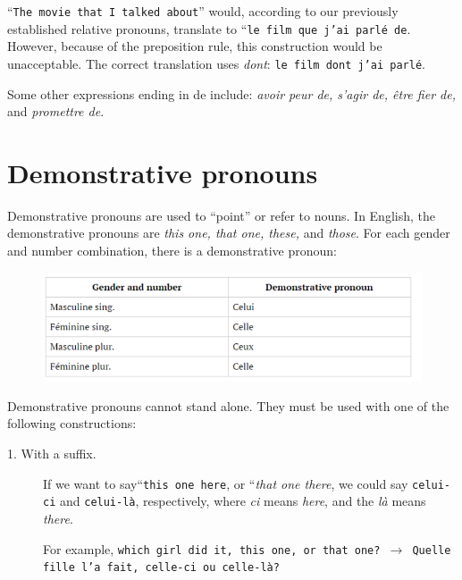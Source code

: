 \documentclass[11pt, oneside]{book}
\begin{document}
{{{	``\texttt{The movie that I talked about}” would, according to our previously established relative pronouns, translate to ``\texttt{le film que j'ai parl\'e de}. However, because of the preposition rule, this construction would be unacceptable. The correct translation uses \textit{dont}: \texttt{le film dont j'ai parl\'e}.  \vspace{0.5\baselineskip}

	Some other expressions ending in de include: \textit{avoir peur de, s'agir de, \^etre fier de,} and \textit{promettre de}. \vspace{0.5\baselineskip}


\section{Demonstrative pronouns}

Demonstrative pronouns are used to ``point” or refer to nouns. In English, the demonstrative pronouns are \textit{this one, that one, these,} and \textit{those}. For each gender and number combination, there is a demonstrative pronoun: \vspace{0.5\baselineskip}


\begin{figure}[H]
	\includegraphics[scale=0.6]{charts/demonstrativePronouns.png}
\end{figure} \vspace{0.5\baselineskip} 

Demonstrative pronouns cannot stand alone. They must be used with one of the following constructions:

\begin{description}
	\item[1.  With a suffix.] If we want to say``\texttt{this one here}, or ``\textit{that one there}, we could say \texttt{celui-ci} and \texttt{celui-l\`a}, respectively, where \textit{ci} means \textit{here}, and the \textit{l\`a} means \textit{there}.
		
		For example, \texttt{which girl did it, this one, or that one? $\rightarrow$ Quelle fille l'a fait, celle-ci ou celle-l\`a?}
		

\end{description}}}}
\end{document}
